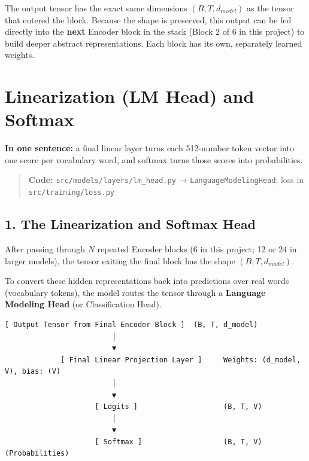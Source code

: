 \documentclass[11pt,a4paper,oneside]{report}
\begin{document}
The output tensor has the exact same dimensions \textbf{\((B, T, d_{model})\)} as the tensor that entered the block. Because the shape is preserved, this output can be fed directly into the \textbf{next} Encoder block in the stack (Block 2 of 6 in this project) to build deeper abstract representations. Each block has its own, separately learned weights.




\chapter{Linearization (LM Head) and Softmax}\label{linearization-lm-head-and-softmax}

\textbf{In one sentence:} a final linear layer turns each 512-number token vector into one score per vocabulary word, and softmax turns those scores into probabilities.

\begin{quote}
\textbf{Code:} \texttt{src/\allowbreak{}models/\allowbreak{}layers/\allowbreak{}lm\_\allowbreak{}head.\allowbreak{}py} → \texttt{LanguageModelingHead}; loss in \texttt{src/\allowbreak{}training/\allowbreak{}loss.\allowbreak{}py}
\end{quote}

\section{1. The Linearization and Softmax Head}\label{1-the-linearization-and-softmax-head}

After passing through \(N\) repeated Encoder blocks (6 in this project; 12 or 24 in larger models), the tensor exiting the final block has the shape \textbf{\((B, T, d_{model})\)}.

To convert these hidden representations back into predictions over real words (vocabulary tokens), the model routes the tensor through a \textbf{Language Modeling Head} (or Classification Head).

\begin{Verbatim}[fontsize=\small]
[ Output Tensor from Final Encoder Block ]  (B, T, d_model)
                         │
                         ▼
             [ Final Linear Projection Layer ]     Weights: (d_model, V), bias: (V)
                         │
                         ▼
                     [ Logits ]                    (B, T, V)
                         │
                         ▼
                     [ Softmax ]                   (B, T, V)  (Probabilities)
\end{Verbatim}
\end{document}
